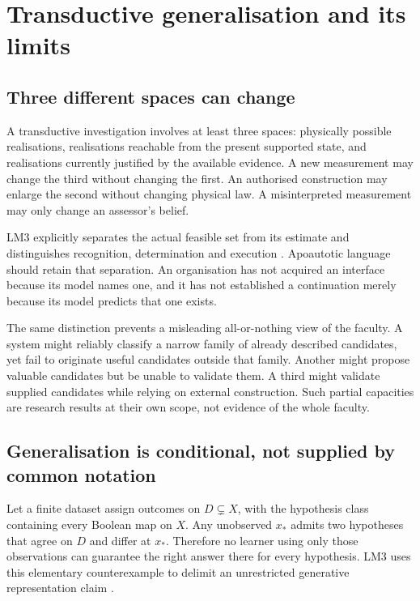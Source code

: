 \section{Transductive generalisation and its limits}
\label{sec:generalisation}

\subsection{Three different spaces can change}

A transductive investigation involves at least three spaces: physically possible realisations, realisations reachable from the present supported state, and realisations currently justified by the available evidence. A new measurement may change the third without changing the first. An authorised construction may enlarge the second without changing physical law. A misinterpreted measurement may only change an assessor's belief.

LM3 explicitly separates the actual feasible set from its estimate and distinguishes recognition, determination and execution \cite[\S17.1]{LM3}. Apoautotic language should retain that separation. An organisation has not acquired an interface because its model names one, and it has not established a continuation merely because its model predicts that one exists.

The same distinction prevents a misleading all-or-nothing view of the faculty. A system might reliably classify a narrow family of already described candidates, yet fail to originate useful candidates outside that family. Another might propose valuable candidates but be unable to validate them. A third might validate supplied candidates while relying on external construction. Such partial capacities are research results at their own scope, not evidence of the whole faculty.

\subsection{Generalisation is conditional, not supplied by common notation}

Let a finite dataset assign outcomes on \(D\subsetneq X\), with the hypothesis class containing every Boolean map on \(X\). Any unobserved \(x_*\) admits two hypotheses that agree on \(D\) and differ at \(x_*\). Therefore no learner using only those observations can guarantee the right answer there for every hypothesis. LM3 uses this elementary counterexample to delimit an unrestricted generative representation claim \cite[Proposition 11.2]{LM3}.

